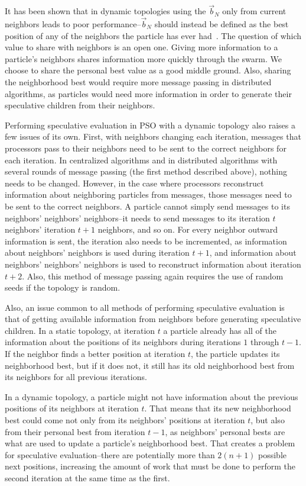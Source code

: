 \documentclass[conference,letterpaper]{IEEEtran}
\providecommand{\nbest}{\ensuremath{\Vec{b}_N}}
\begin{document}
It has been shown that in dynamic topologies using the $\nbest$ only from
current neighbors leads to poor performance--$\nbest$ should instead be defined
as the best position of any of the neighbors the particle has ever
had~\cite{mcnabb-cec09}.  The question of which value to share with neighbors
is an open one.  Giving more information to a particle's neighbors shares
information more quickly through the swarm.  We choose to share the personal
best value as a good middle ground.  Also, sharing the neighborhood best would
require more message passing in distributed algorithms, as particles would need
more information in order to generate their speculative children from their
neighbors.

Performing speculative evaluation in PSO with a dynamic topology also raises a
few issues of its own.  First, with neighbors changing each iteration, messages
that processors pass to their neighbors need to be sent to the correct
neighbors for each iteration.  In centralized algorithms and in distributed
algorithms with several rounds of message passing (the first method described
above), nothing needs to be changed.  However, in the case where processors
reconstruct information about neighboring particles from messages, those
messages need to be sent to the correct neighbors.  A particle cannot simply
send messages to its neighbors' neighbors' neighbors--it needs to send messages
to its iteration $t$ neighbors' iteration $t+1$ neighbors, and so on.  For
every neighbor outward information is sent, the iteration also needs to be
incremented, as information about neighbors' neighbors is used during iteration
$t+1$, and information about neighbors' neighbors' neighbors is used to
reconstruct information about iteration $t+2$.  Also, this method of message
passing again requires the use of random seeds if the topology is random.

Also, an issue common to all methods of performing speculative evaluation is
that of getting available information from neighbors before generating
speculative children.  In a static topology, at iteration $t$ a particle
already has all of the information about the positions of its neighbors during
iterations $1$ through $t-1$.  If the neighbor finds a better position at 
iteration $t$, the particle updates its neighborhood best, but if it does not,
it still has its old neighborhood best from its neighbors for all previous 
iterations.

In a dynamic topology, a particle might not have information about the previous
positions of its neighbors at iteration $t$.  That means that its new
neighborhood best could come not only from its neighbors' positions at
iteration $t$, but also from their personal best from iteration $t-1$, as
neighbors' personal bests are what are used to update a particle's neighborhood
best.  That creates a problem for speculative evaluation--there are potentially
more than $2(n+1)$ possible next positions, increasing the amount of work that
must be done to perform the second iteration at the same time as the first.
\end{document}
